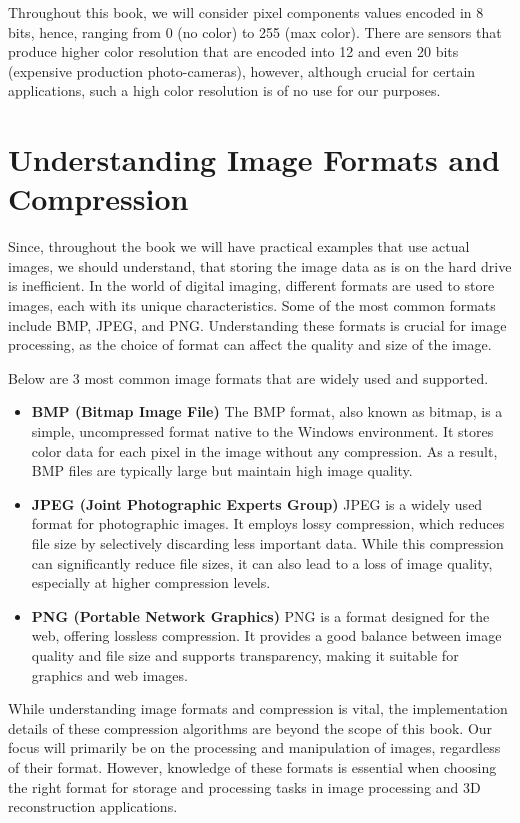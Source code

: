 \documentclass[11pt]{book}
\begin{document}
Throughout this book, we will consider pixel components values encoded in 8 bits, hence, ranging from 0 (no color) to 255 (max color). There are sensors that produce higher color resolution that  are encoded into 12 and even 20 bits (expensive production photo-cameras), however, although crucial for certain applications, such a high color resolution is of no use for our purposes.   


\section{Understanding Image Formats and Compression}

Since, throughout the book we will have practical examples that use actual images, we should understand, that storing the image data as is on the hard drive is inefficient. In the world of digital imaging, different formats are used to store images, each with its unique characteristics. Some of the most common formats include BMP, JPEG, and PNG. Understanding these formats is crucial for image processing, as the choice of format can affect the quality and size of the image.

Below are 3 most common image formats that are widely used and supported.

\begin{itemize}
	\item {\bf BMP (Bitmap Image File)} The BMP format, also known as bitmap, is a simple, uncompressed format native to the Windows environment. It stores color data for each pixel in the image without any compression. As a result, BMP files are typically large but maintain high image quality.
	\item {\bf JPEG (Joint Photographic Experts Group)} JPEG is a widely used format for photographic images. It employs lossy compression, which reduces file size by selectively discarding less important data. While this compression can significantly reduce file sizes, it can also lead to a loss of image quality, especially at higher compression levels.
	\item {\bf PNG (Portable Network Graphics)} PNG is a format designed for the web, offering lossless compression. It provides a good balance between image quality and file size and supports transparency, making it suitable for graphics and web images.
\end{itemize}


While understanding image formats and compression is vital, the implementation details of these compression algorithms are beyond the scope of this book. Our focus will primarily be on the processing and manipulation of images, regardless of their format. However, knowledge of these formats is essential when choosing the right format for storage and processing tasks in image processing and 3D reconstruction applications.
\end{document}
